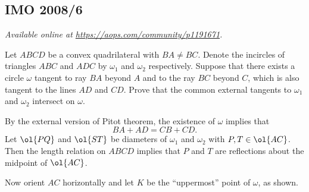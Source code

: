 \documentclass[11pt]{scrartcl}
\begin{document}
\subsection{IMO 2008/6}
\textsl{Available online at \url{https://aops.com/community/p1191671}.}
\begin{mdframed}[style=mdpurplebox,frametitle={Problem statement}]
Let $ABCD$ be a convex quadrilateral with $BA \neq BC$.
Denote the incircles of triangles $ABC$ and $ADC$
by $\omega_1$ and $\omega_2$ respectively.
Suppose that there exists a circle $\omega$ tangent
to ray $BA$ beyond $A$ and to the ray $BC$ beyond $C$,
which is also tangent to the lines $AD$ and $CD$.
Prove that the common external tangents to
$\omega_1$ and $\omega_2$ intersect on $\omega$.
\end{mdframed}
By the external version of Pitot theorem, the existence
of $\omega$ implies that
\[ BA + AD = CB + CD. \]
Let $\ol{PQ}$ and $\ol{ST}$ be diameters of $\omega_1$ and $\omega_2$
with $P, T \in \ol{AC}$.
Then the length relation on $ABCD$ implies that $P$ and $T$
are reflections about the midpoint of $\ol{AC}$.

Now orient $AC$ horizontally and let $K$ be the ``uppermost'' point of $\omega$, as shown.
\end{document}
